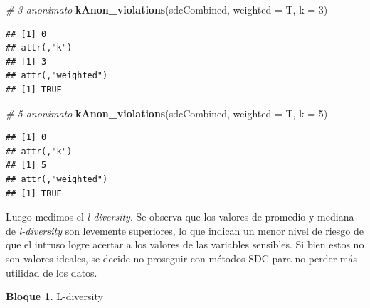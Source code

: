 \documentclass[]{book}
\newenvironment{Shaded}{\begin{snugshade}}{\end{snugshade}}
\newcommand{\CommentTok}[1]{\textcolor[rgb]{0.56,0.35,0.01}{\textit{#1}}}
\newcommand{\DataTypeTok}[1]{\textcolor[rgb]{0.13,0.29,0.53}{#1}}
\newcommand{\DecValTok}[1]{\textcolor[rgb]{0.00,0.00,0.81}{#1}}
\newcommand{\KeywordTok}[1]{\textcolor[rgb]{0.13,0.29,0.53}{\textbf{#1}}}
\newcommand{\NormalTok}[1]{#1}
\newcommand{\OperatorTok}[1]{\textcolor[rgb]{0.81,0.36,0.00}{\textbf{#1}}}
\newcommand{\OtherTok}[1]{\textcolor[rgb]{0.56,0.35,0.01}{#1}}
\newcommand{\StringTok}[1]{\textcolor[rgb]{0.31,0.60,0.02}{#1}}
\theoremstyle{definition}
\theoremstyle{definition}
\newtheorem{example}{Bloque}[chapter]
\theoremstyle{definition}
\theoremstyle{definition}
\theoremstyle{remark}
\begin{document}
\begin{Shaded}
\begin{Highlighting}[]
\CommentTok{# 3-anonimato}
\KeywordTok{kAnon_violations}\NormalTok{(sdcCombined, }\DataTypeTok{weighted =}\NormalTok{ T, }\DataTypeTok{k =} \DecValTok{3}\NormalTok{) }
\end{Highlighting}
\end{Shaded}

\begin{verbatim}
## [1] 0
## attr(,"k")
## [1] 3
## attr(,"weighted")
## [1] TRUE
\end{verbatim}

\begin{Shaded}
\begin{Highlighting}[]
\CommentTok{# 5-anonimato}
\KeywordTok{kAnon_violations}\NormalTok{(sdcCombined, }\DataTypeTok{weighted =}\NormalTok{ T, }\DataTypeTok{k =} \DecValTok{5}\NormalTok{) }
\end{Highlighting}
\end{Shaded}

\begin{verbatim}
## [1] 0
## attr(,"k")
## [1] 5
## attr(,"weighted")
## [1] TRUE
\end{verbatim}

Luego medimos el \emph{l-diversity}. Se observa que los valores de promedio y mediana de \emph{l-diversity} son levemente superiores, lo que indican un menor nivel de riesgo de que el intruso logre acertar a los valores de las variables sensibles. Si bien estos no son valores ideales, se decide no proseguir con métodos SDC para no perder más utilidad de los datos.

\begin{example}
\protect\hypertarget{exm:bloque69nbm}{}{\label{exm:bloque69nbm} }L-diversity
\end{example}

\begin{Shaded}
\end{Shaded}
\end{document}
